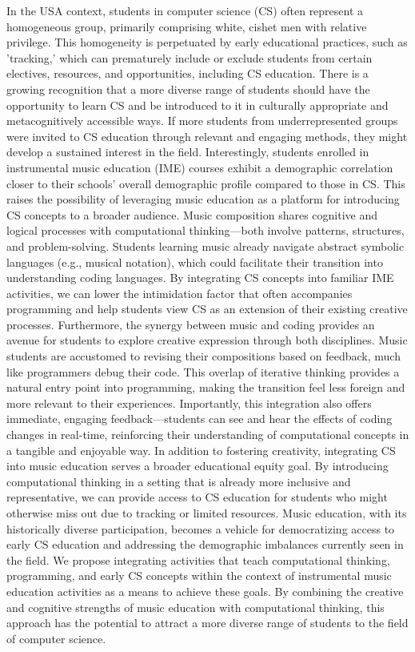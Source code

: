 \documentclass[manuscript,screen,review]{acmart}
\begin{document}
In the USA context, students in computer science (CS) often represent a homogeneous group, primarily comprising white, cishet men with relative privilege. This homogeneity is perpetuated by early educational practices, such as 'tracking,' which can prematurely include or exclude students from certain electives, resources, and opportunities, including CS education. There is a growing recognition that a more diverse range of students should have the opportunity to learn CS and be introduced to it in culturally appropriate and metacognitively accessible ways. If more students from underrepresented groups were invited to CS education through relevant and engaging methods, they might develop a sustained interest in the field.
Interestingly, students enrolled in instrumental music education (IME) courses exhibit a demographic correlation closer to their schools' overall demographic profile compared to those in CS. This raises the possibility of leveraging music education as a platform for introducing CS concepts to a broader audience. Music composition shares cognitive and logical processes with computational thinking—both involve patterns, structures, and problem-solving. Students learning music already navigate abstract symbolic languages (e.g., musical notation), which could facilitate their transition into understanding coding languages. By integrating CS concepts into familiar IME activities, we can lower the intimidation factor that often accompanies programming and help students view CS as an extension of their existing creative processes.
Furthermore, the synergy between music and coding provides an avenue for students to explore creative expression through both disciplines. Music students are accustomed to revising their compositions based on feedback, much like programmers debug their code. This overlap of iterative thinking provides a natural entry point into programming, making the transition feel less foreign and more relevant to their experiences. Importantly, this integration also offers immediate, engaging feedback—students can see and hear the effects of coding changes in real-time, reinforcing their understanding of computational concepts in a tangible and enjoyable way.
In addition to fostering creativity, integrating CS into music education serves a broader educational equity goal. By introducing computational thinking in a setting that is already more inclusive and representative, we can provide access to CS education for students who might otherwise miss out due to tracking or limited resources. Music education, with its historically diverse participation, becomes a vehicle for democratizing access to early CS education and addressing the demographic imbalances currently seen in the field.
We propose integrating activities that teach computational thinking, programming, and early CS concepts within the context of instrumental music education activities as a means to achieve these goals. By combining the creative and cognitive strengths of music education with computational thinking, this approach has the potential to attract a more diverse range of students to the field of computer science.
\end{document}
